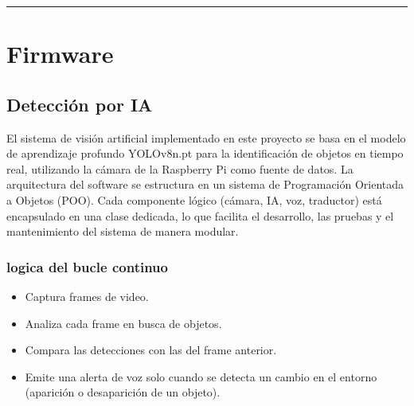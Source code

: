 \documentclass[12pt,a4paper]{article}
\newcommand{\separador}{\vspace{0.5cm}\noindent\rule{\linewidth}{0.5pt}\vspace{0.5cm}}
\begin{document}
\separador

\section{Firmware}

\subsection{Detección por IA}
El sistema de visión artificial implementado en este proyecto se basa en el modelo de aprendizaje profundo YOLOv8n.pt para la identificación de objetos en tiempo real, utilizando la cámara de la Raspberry Pi como fuente de datos. La arquitectura del software se estructura en un sistema de Programación Orientada a Objetos (POO). Cada componente lógico (cámara, IA, voz, traductor) está encapsulado en una clase dedicada, lo que facilita el desarrollo, las pruebas y el mantenimiento del sistema de manera modular.

\subsubsection{logica del bucle continuo}
\begin{itemize}
\item Captura frames de video.
\item Analiza cada frame en busca de objetos.
\item Compara las detecciones con las del frame anterior.
\item Emite una alerta de voz solo cuando se detecta un cambio en el entorno (aparición o desaparición de un objeto).
\end{itemize}
\end{document}
